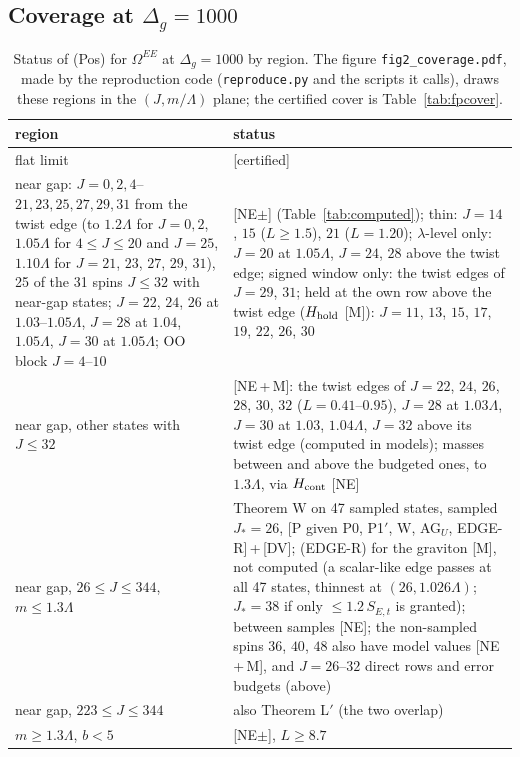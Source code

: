 \documentclass[aps,prl,onecolumn,superscriptaddress,nofootinbib]{revtex4-2}
\begin{document}
\subsection{Coverage at $\Delta_g=1000$}
\begin{table}[!htbp]
\caption{\label{tab:coverLS}Status of (Pos) for $\Omega^{EE}$ at $\Delta_g=1000$ by region. The figure \texttt{fig2\_coverage.pdf}, made by the
reproduction code (\texttt{reproduce.py} and the scripts it calls), draws these regions in the $(J,m/\Lambda)$ plane; the certified cover is Table~\ref{tab:fpcover}.}
\footnotesize
\begin{ruledtabular}
\begin{tabular}{L{6.2cm}L{10.2cm}}
region & status\\\hline
flat limit & [certified]\\
near gap: $J=0,2,4$--$21,23,25,27,29,31$ from the twist edge (to $1.2\Lambda$ for $J=0,2$, $1.05\Lambda$ for $4\le J\le20$ and $J=25$, $1.10\Lambda$ for $J=21$, $23$, $27$, $29$, $31$), 25 of the 31 spins $J\le32$ with near-gap states; $J=22$, $24$, $26$ at $1.03$--$1.05\Lambda$, $J=28$ at $1.04$, $1.05\Lambda$, $J=30$ at $1.05\Lambda$; OO block $J=4$--$10$ & [NE$\pm$] (Table~\ref{tab:computed}); thin: $J=14$, $15$ ($L\ge1.5$), $21$ ($L=1.20$); $\lambda$-level only: $J=20$ at $1.05\Lambda$, $J=24$, $28$ above the twist edge; signed window only: the twist edges of $J=29$, $31$; held at the own row above the twist edge ($H_{\rm hold}$ [M]): $J=11$, $13$, $15$, $17$, $19$, $22$, $26$, $30$\\
near gap, other states with $J\le32$ & [NE\,+\,M]: the twist edges of $J=22$, $24$, $26$, $28$, $30$, $32$ ($L=0.41$--$0.95$), $J=28$ at $1.03\Lambda$, $J=30$ at $1.03$, $1.04\Lambda$, $J=32$ above its twist edge (computed in models); masses between and above the budgeted ones, to $1.3\Lambda$, via $H_{\rm cont}$ [NE]\\
near gap, $26\le J\le344$, $m\le1.3\Lambda$ & Theorem W on 47 sampled states, sampled $J_*=26$, [P given P0, P1$'$, W, AG$_U$, EDGE-R]\,+\,[DV]; (EDGE-R) for the graviton [M], not computed (a scalar-like edge passes at all 47 states, thinnest at $(26,1.026\Lambda)$; $J_*=38$ if only $\le1.2\,S_{E,t}$ is granted); between samples [NE]; the non-sampled spins $36$, $40$, $48$ also have model values [NE\,+\,M], and $J=26$--$32$ direct rows and error budgets (above)\\
near gap, $223\le J\le344$ & also Theorem L$'$ (the two overlap)\\
$m\ge1.3\Lambda$, $b<5$ & [NE$\pm$], $L\ge8.7$\\

\end{tabular}
\end{ruledtabular}
\end{table}
\end{document}
